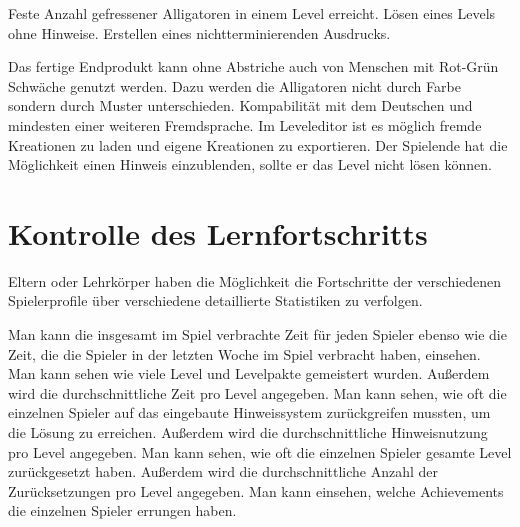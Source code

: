 \begin{requirements}
\begin{requirements}
			 Feste Anzahl gefressener Alligatoren in einem Level erreicht.
			 Lösen eines Levels ohne Hinweise.
			 Erstellen eines nichtterminierenden Ausdrucks.
		\end{requirements}
	Das fertige Endprodukt kann ohne Abstriche auch von Menschen mit Rot-Grün Schwäche genutzt werden. Dazu werden die Alligatoren nicht durch Farbe sondern durch Muster unterschieden.
	Kompabilität mit dem Deutschen und mindesten einer weiteren Fremdsprache.
	Im Leveleditor ist es möglich fremde Kreationen zu laden und eigene Kreationen zu exportieren.
	 Der Spielende hat die Möglichkeit einen Hinweis einzublenden, sollte er das Level nicht lösen können.


\end{requirements}


\section{Kontrolle des Lernfortschritts}

\begin{requirements}
	Eltern oder Lehrkörper haben die Möglichkeit die Fortschritte der verschiedenen Spielerprofile über verschiedene detaillierte Statistiken zu verfolgen.
	\begin{requirements}
		 Man kann die insgesamt im Spiel verbrachte Zeit für jeden Spieler ebenso wie die Zeit, die die Spieler in der letzten Woche im Spiel verbracht haben, einsehen.
		 Man kann sehen wie viele Level und Levelpakte gemeistert wurden.
		Außerdem wird die durchschnittliche Zeit pro Level angegeben.
		 Man kann sehen, wie oft die einzelnen Spieler auf das eingebaute Hinweissystem zurückgreifen mussten, um die Lösung zu erreichen.
		Außerdem wird die durchschnittliche Hinweisnutzung pro Level angegeben.
		 Man kann sehen, wie oft die einzelnen Spieler gesamte Level zurückgesetzt haben.
		Außerdem wird die durchschnittliche Anzahl der Zurücksetzungen pro Level angegeben.
		 Man kann einsehen, welche Achievements die einzelnen Spieler errungen haben.
	\end{requirements}
\end{requirements}
